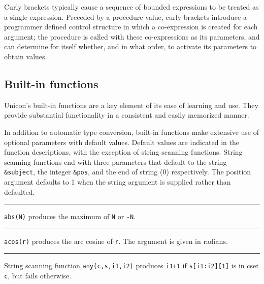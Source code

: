 \noindent
Curly brackets typically cause a sequence
of bounded expressions to be treated as a single expression. Preceded
by a procedure value, curly brackets introduce a programmer defined
control structure in which a co-expression is created for each
argument; the procedure is called with these co-expressions as its
parameters, and can determine for itself whether, and in what order, to
activate its parameters to obtain values.

\subsection*{Built-in functions}

Unicon's built-in functions
are a key element of its ease of learning and use. They provide
substantial functionality in a consistent and easily memorized manner.

In addition to automatic type conversion, built-in functions make
extensive use of optional parameters with default values. Default
values are indicated in the function descriptions, with the exception
of string scanning functions. String scanning functions end with three parameters that
default to the string \texttt{\&subject}, the integer \texttt{\&pos},
and the end of string (0) respectively. The position argument defaults
to 1 when the string argument is supplied rather than defaulted.

\bigskip

\hrule\vspace{0.1cm}

\noindent {}\texttt{abs(N)} produces the maximum of
\texttt{N} or \texttt{{}-N}.

\bigskip

\hrule\vspace{0.1cm}

\noindent
{}\texttt{acos(r)} produces the arc cosine of
\texttt{r}. The argument is given in radians.

\bigskip

\hrule\vspace{0.1cm}

\noindent
{}String scanning function
\texttt{any(c,s,i1,i2)} produces \texttt{i1+1} if \texttt{s[i1:i2][1]}
is in cset \texttt{c}, but fails otherwise.

